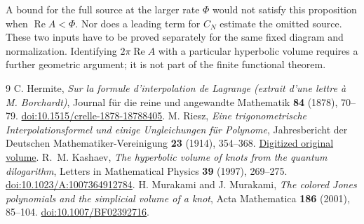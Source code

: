 \documentclass[11pt]{article}
\numberwithin{equation}{section}
\theoremstyle{definition}\newtheorem{definition}[theorem]{Definition}
\theoremstyle{remark}\newtheorem{remark}[theorem]{Remark}
\begin{document}
A bound for the full source at the larger rate $\Phi$ would not satisfy
this proposition when $\operatorname{Re}A<\Phi$. Nor does a leading
term for $C_N$ estimate the omitted source. These two inputs have to be
proved separately for the same fixed diagram and normalization.
Identifying $2\pi\operatorname{Re}A$ with a particular hyperbolic
volume requires a further geometric argument; it is not part of the
finite functional theorem.

\begin{thebibliography}{9}
C. Hermite, \emph{Sur la formule d'interpolation de Lagrange
(extrait d'une lettre \`a M. Borchardt)}, Journal f\"ur die reine und
angewandte Mathematik \textbf{84} (1878), 70--79.
\href{https://doi.org/10.1515/crelle-1878-18788405}{doi:10.1515/crelle-1878-18788405}.
M. Riesz, \emph{Eine trigonometrische Interpolationsformel und einige
Ungleichungen f\"ur Polynome}, Jahresbericht der Deutschen
Mathematiker-Vereinigung \textbf{23} (1914), 354--368.
\href{https://gdz.sub.uni-goettingen.de/id/PPN37721857X_0023}{Digitized original volume}.
R.~M. Kashaev, \emph{The hyperbolic volume of knots from the quantum
dilogarithm}, Letters in Mathematical Physics \textbf{39} (1997),
269--275. \href{https://doi.org/10.1023/A:1007364912784}{doi:10.1023/A:1007364912784}.
H. Murakami and J. Murakami, \emph{The colored Jones polynomials and the
simplicial volume of a knot}, Acta Mathematica \textbf{186} (2001),
85--104. \href{https://doi.org/10.1007/BF02392716}{doi:10.1007/BF02392716}.
\end{thebibliography}
\end{document}
